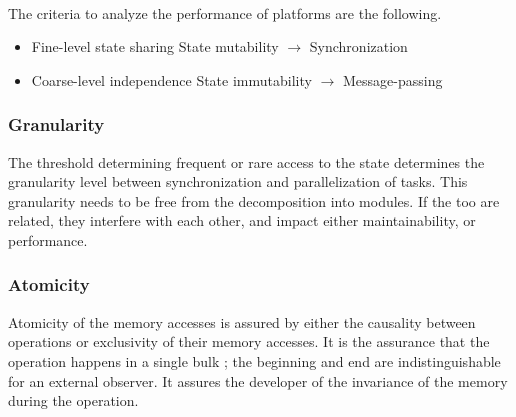 \paragraph{}

The criteria to analyze the performance of platforms are the following.

\begin{itemize}
\item Fine-level state sharing
  \subitem State mutability $\to$ Synchronization
\item Coarse-level independence
  \subitem State immutability $\to$ Message-passing
\end{itemize}

\subsubsection{Granularity}

The threshold determining frequent or rare access to the state determines the granularity level between synchronization and parallelization of tasks.
This granularity needs to be free from the decomposition into modules.
If the too are related, they interfere with each other, and impact either maintainability, or performance.

\subsubsection{Atomicity}

Atomicity of the memory accesses is assured by either the causality between operations or exclusivity of their memory accesses.
It is the assurance that the operation happens in a single bulk ; the beginning and end are indistinguishable for an external observer.
It assures the developer of the invariance of the memory during the operation.





